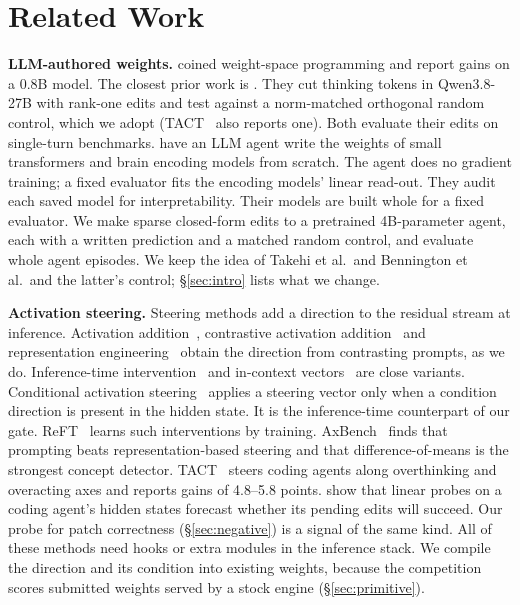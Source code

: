 \section{Related Work}
\label{sec:related_work}
\textbf{LLM-authored weights.} \citet{Takehi2026SparksWeightspace} coined weight-space programming and report gains on a 0.8B model. The closest prior work is \citet{Bennington2026GradientfreeWeight}. They cut thinking tokens in Qwen3.8-27B with rank-one edits and test against a norm-matched orthogonal random control, which we adopt (TACT~\citep{Sui2026TactMitigating} also reports one). Both evaluate their edits on single-turn benchmarks. \citet{Mehta2026InterpretableWeightspace} have an LLM agent write the weights of small transformers and brain encoding models from scratch. The agent does no gradient training; a fixed evaluator fits the encoding models' linear read-out. They audit each saved model for interpretability. Their models are built whole for a fixed evaluator. We make sparse closed-form edits to a pretrained 4B-parameter agent, each with a written prediction and a matched random control, and evaluate whole agent episodes. We keep the idea of Takehi et al.\ and Bennington et al.\ and the latter's control; \S\ref{sec:intro} lists what we change.



\textbf{Activation steering.} Steering methods add a direction to the residual stream at inference. Activation addition~\citep{Turner2023SteeringLanguage}, contrastive activation addition~\citep{Panickssery2023SteeringLlama} and representation engineering~\citep{Zou2023RepresentationEngineering} obtain the direction from contrasting prompts, as we do. Inference-time intervention~\citep{Li2023InferencetimeIntervention} and in-context vectors~\citep{Liu2023IncontextVectors} are close variants. Conditional activation steering~\citep{Lee2024ProgrammingRefusal} applies a steering vector only when a condition direction is present in the hidden state. It is the inference-time counterpart of our gate. ReFT~\citep{Wu2024ReftRepresentation} learns such interventions by training. AxBench~\citep{Wu2025AxbenchSteering} finds that prompting beats representation-based steering and that difference-of-means is the strongest concept detector. TACT~\citep{Sui2026TactMitigating} steers coding agents along overthinking and overacting axes and reports gains of 4.8--5.8 points. \citet{Silva2026LatentProgramming} show that linear probes on a coding agent's hidden states forecast whether its pending edits will succeed. Our probe for patch correctness (\S\ref{sec:negative}) is a signal of the same kind. All of these methods need hooks or extra modules in the inference stack. We compile the direction and its condition into existing weights, because the competition scores submitted weights served by a stock engine (\S\ref{sec:primitive}).

